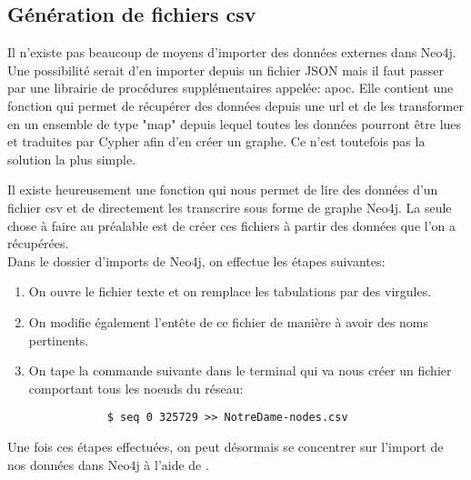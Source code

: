 \documentclass[12pt,twoside, openright]{memoir}
\newcommand{\courrier}[1]{{\fontfamily{qcr}\selectfont {#1}}}
\begin{document}
	\subsection{Génération de fichiers \gls{csv}}
	Il n'existe pas beaucoup de moyens d'importer des données externes dans Neo4j. Une possibilité serait d'en importer depuis un fichier JSON mais il faut passer par une librairie de procédures supplémentaires appelée: \gls{apoc}. Elle contient une fonction \courrier{apoc.load_json} qui permet de récupérer des données depuis une \gls{url} et de les transformer en un ensemble de type "map" depuis lequel toutes les données pourront être lues et traduites par Cypher afin d'en créer un graphe. Ce n'est toutefois pas la solution la plus simple.\par
	Il existe heureusement une fonction \courrier{LOAD CSV} qui nous permet de lire des données d'un fichier \gls{csv} et de directement les transcrire sous forme de graphe Neo4j. La seule chose à faire au préalable est de créer ces fichiers à partir des données que l'on a récupérées.\\
	Dans le dossier d'imports de Neo4j, on effectue les étapes suivantes:
	\begin{enumerate}
		\item On ouvre le fichier texte et on remplace les tabulations par des virgules. 
		\item On modifie également l'entête de ce fichier de manière à avoir des noms pertinents.
		\item On tape la commande suivante dans le terminal qui va nous créer un fichier comportant tous les noeuds du réseau:
		\begin{verbatim}
			$ seq 0 325729 >> NotreDame-nodes.csv
		\end{verbatim}
	\end{enumerate}
	Une fois ces étapes effectuées, on peut désormais se concentrer sur l'import de nos données dans Neo4j à l'aide de \courrier{Cypher}.
\end{document}
